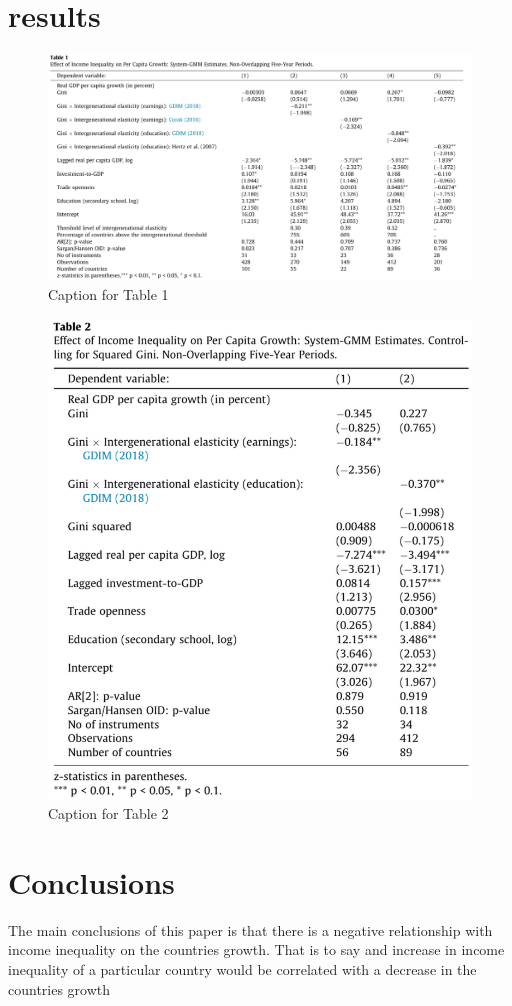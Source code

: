 \documentclass[10pt, oneside]{article}
\begin{document}
\section{results}

\begin{figure}
	\centering
	\includegraphics[width=\textwidth]{table_1.png}  %
	\caption{Caption for Table 1}
\end{figure}

\begin{figure}
	\centering
	\includegraphics[width=\textwidth]{table_2.png}  %
	\caption{Caption for Table 2}
\end{figure}

\section{Conclusions}

The main conclusions of this paper is that there is a negative relationship with income inequality on the countries growth. That is to say and increase
in income inequality of a particular country would be correlated with a decrease in the countries growth

\printbibliography
\end{document}
